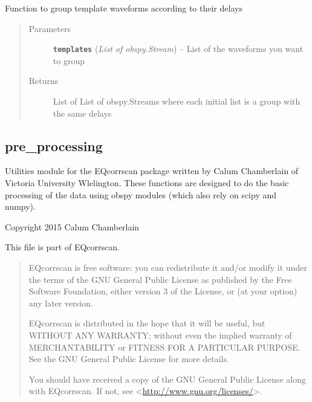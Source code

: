 \documentclass[a4paper,10pt,english]{sphinxmanual}
\begin{document}

\begin{fulllineitems}
\label{utils:clustering.group_delays}
Function to group template waveforms according to their delays
\begin{quote}\begin{description}
\item[{Parameters}] \leavevmode
\textbf{\texttt{templates}} (\emph{List of obspy.Stream}) -- List of the waveforms you want to group

\item[{Returns}] \leavevmode
List of List of obspy.Streams where each initial list is a group            with the same delays

\end{description}\end{quote}

\end{fulllineitems}



\subsection{pre\_processing}
\label{utils:pre-processing}\label{utils:module-pre_processing}
Utilities module for the EQcorrscan package written by Calum Chamberlain of
Victoria University Wlelington.  These functions are designed to do the basic
processing of the data using obspy modules (which also rely on scipy and numpy).

Copyright 2015 Calum Chamberlain

This file is part of EQcorrscan.
\begin{quote}

EQcorrscan is free software: you can redistribute it and/or modify
it under the terms of the GNU General Public License as published by
the Free Software Foundation, either version 3 of the License, or
(at your option) any later version.

EQcorrscan is distributed in the hope that it will be useful,
but WITHOUT ANY WARRANTY; without even the implied warranty of
MERCHANTABILITY or FITNESS FOR A PARTICULAR PURPOSE.  See the
GNU General Public License for more details.

You should have received a copy of the GNU General Public License
along with EQcorrscan.  If not, see \textless{}\href{http://www.gnu.org/licenses/}{http://www.gnu.org/licenses/}\textgreater{}.
\end{quote}
\end{document}
